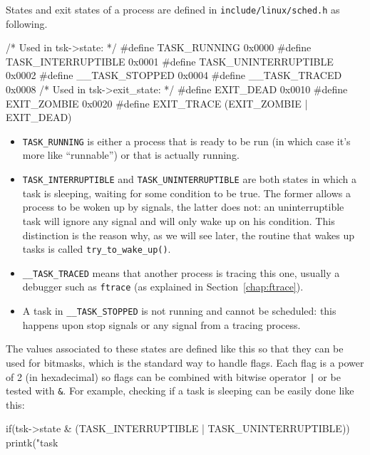 \documentclass[10pt]{book}
\begin{document}
States and exit states of a process are defined in \verb|include/linux/sched.h| as following.
\begin{code}
/* Used in tsk->state: */
#define TASK_RUNNING    0x0000
#define TASK_INTERRUPTIBLE  0x0001
#define TASK_UNINTERRUPTIBLE    0x0002
#define __TASK_STOPPED			0x0004
#define __TASK_TRACED			0x0008
/* Used in tsk->exit_state: */
#define EXIT_DEAD   0x0010
#define EXIT_ZOMBIE 0x0020
#define EXIT_TRACE  (EXIT_ZOMBIE | EXIT_DEAD)
\end{code}
\begin{itemize}
\item \verb|TASK_RUNNING| is either a process that is ready to be run
  (in which case it's more like ``runnable'') or that is actually
  running.

\item   \verb|TASK_INTERRUPTIBLE| and \verb|TASK_UNINTERRUPTIBLE| are both
  states in which a task is sleeping, waiting for some condition to
  be true. The former allows a process to be woken up by signals, the
  latter does not: an uninterruptible task will ignore any signal and
  will only wake up on his condition. This distinction is the reason
  why, as we will see later, the routine that wakes up tasks is called
  \verb|try_to_wake_up()|. 
\item \verb|__TASK_TRACED| means that another process is tracing this
  one, usually a debugger such as \verb|ftrace| (as explained in
  Section~\ref{chap:ftrace}).
\item A task in \verb|__TASK_STOPPED| is not running and cannot be
  scheduled: this happens upon stop signals or any signal from a
  tracing process.
\end{itemize}

The values associated to these states are defined like this so that they can be used for bitmasks, which is the standard way to handle flags. Each flag is a power of 2 (in hexadecimal) so flags can be combined with bitwise operator \verb&|& or be tested with \verb|&|. For example, checking if a task is sleeping can be easily done like this: 

\begin{code}
if(tsk->state & (TASK_INTERRUPTIBLE | TASK_UNINTERRUPTIBLE))
    printk("task %
\end{code}
\end{document}
